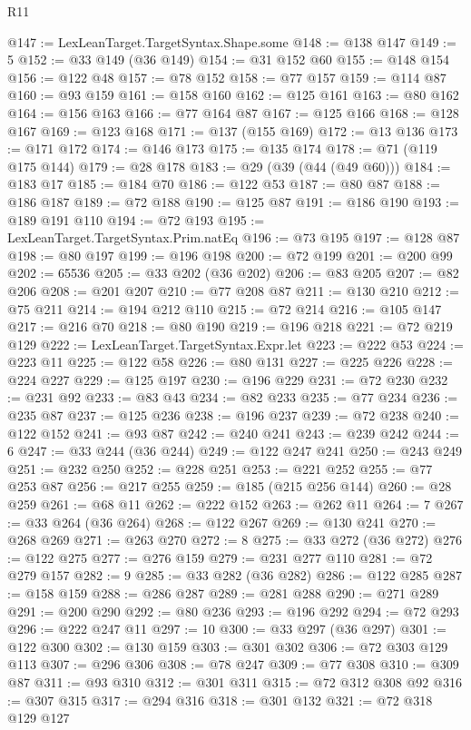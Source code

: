 \begin{lexlean}{R11}
\begin{coremodule}
@147 := LexLeanTarget.TargetSyntax.Shape.some
@148 := @138 @147
@149 := 5
@152 := @33 @149 (@36 @149)
@154 := @31 @152 @60
@155 := @148 @154
@156 := @122 @48
@157 := @78 @152
@158 := @77 @157
@159 := @114 @87
@160 := @93 @159
@161 := @158 @160
@162 := @125 @161
@163 := @80 @162
@164 := @156 @163
@166 := @77 @164 @87
@167 := @125 @166
@168 := @128 @167
@169 := @123 @168
@171 := @137 (@155 @169)
@172 := @13 @136
@173 := @171 @172
@174 := @146 @173
@175 := @135 @174
@178 := @71 (@119 @175 @144)
@179 := @28 @178
@183 := @29 (@39 (@44 (@49 @60)))
@184 := @183 @17
@185 := @184 @70
@186 := @122 @53
@187 := @80 @87
@188 := @186 @187
@189 := @72 @188
@190 := @125 @87
@191 := @186 @190
@193 := @189 @191 @110
@194 := @72 @193
@195 := LexLeanTarget.TargetSyntax.Prim.natEq
@196 := @73 @195
@197 := @128 @87
@198 := @80 @197
@199 := @196 @198
@200 := @72 @199
@201 := @200 @99
@202 := 65536
@205 := @33 @202 (@36 @202)
@206 := @83 @205
@207 := @82 @206
@208 := @201 @207
@210 := @77 @208 @87
@211 := @130 @210
@212 := @75 @211
@214 := @194 @212 @110
@215 := @72 @214
@216 := @105 @147
@217 := @216 @70
@218 := @80 @190
@219 := @196 @218
@221 := @72 @219 @129
@222 := LexLeanTarget.TargetSyntax.Expr.let
@223 := @222 @53
@224 := @223 @11
@225 := @122 @58
@226 := @80 @131
@227 := @225 @226
@228 := @224 @227
@229 := @125 @197
@230 := @196 @229
@231 := @72 @230
@232 := @231 @92
@233 := @83 @43
@234 := @82 @233
@235 := @77 @234
@236 := @235 @87
@237 := @125 @236
@238 := @196 @237
@239 := @72 @238
@240 := @122 @152
@241 := @93 @87
@242 := @240 @241
@243 := @239 @242
@244 := 6
@247 := @33 @244 (@36 @244)
@249 := @122 @247 @241
@250 := @243 @249
@251 := @232 @250
@252 := @228 @251
@253 := @221 @252
@255 := @77 @253 @87
@256 := @217 @255
@259 := @185 (@215 @256 @144)
@260 := @28 @259
@261 := @68 @11
@262 := @222 @152
@263 := @262 @11
@264 := 7
@267 := @33 @264 (@36 @264)
@268 := @122 @267
@269 := @130 @241
@270 := @268 @269
@271 := @263 @270
@272 := 8
@275 := @33 @272 (@36 @272)
@276 := @122 @275
@277 := @276 @159
@279 := @231 @277 @110
@281 := @72 @279 @157
@282 := 9
@285 := @33 @282 (@36 @282)
@286 := @122 @285
@287 := @158 @159
@288 := @286 @287
@289 := @281 @288
@290 := @271 @289
@291 := @200 @290
@292 := @80 @236
@293 := @196 @292
@294 := @72 @293
@296 := @222 @247 @11
@297 := 10
@300 := @33 @297 (@36 @297)
@301 := @122 @300
@302 := @130 @159
@303 := @301 @302
@306 := @72 @303 @129 @113
@307 := @296 @306
@308 := @78 @247
@309 := @77 @308
@310 := @309 @87
@311 := @93 @310
@312 := @301 @311
@315 := @72 @312 @308 @92
@316 := @307 @315
@317 := @294 @316
@318 := @301 @132
@321 := @72 @318 @129 @127

\end{coremodule}
\end{lexlean}
